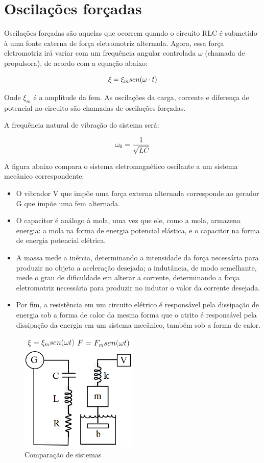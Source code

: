 \section{Oscilações forçadas}

Oscilações forçadas são aquelas que ocorrem quando o circuito RLC é submetido à uma fonte externa de força eletromotriz alternada. Agora, essa força eletromotriz irá variar com um frequência angular controlada $\omega$ (chamada de propulsora), de acordo com a equação abaixo:

\[\large \xi = \xi _{m}sen(\omega \cdot t)\]

Onde $\xi_{m}$ é a amplitude da fem. As oscilações da carga, corrente e diferença de potencial no circuito são chamadas de oscilações forçadas.

A frequência natural de vibração do sistema será:

\[\large \omega_{0} = \frac{1}{\sqrt{LC}}\]

A figura abaixo compara o sistema eletromagnético oscilante a um sistema mecânico correspondente:

\begin{itemize}
\item O vibrador V que impõe uma força externa alternada corresponde ao gerador G que impõe uma fem alternada. 
\item O capacitor é análogo à mola, uma vez que ele, como a mola, armazena energia: a mola na forma de energia potencial elástica, e o capacitor na forma de energia potencial elétrica.
\item A massa mede a inércia, determinando a intensidade da força necessária para produzir no objeto a aceleração desejada; a indutância, de modo semelhante, mede o grau de dificuldade em alterar a corrente, determinando a força eletromotriz necessária para produzir no indutor o valor da corrente desejada.
\item Por fim, a resistência em um circuito elétrico é responsável pela dissipação de energia sob a forma de calor da mesma forma que o atrito é responsável pela dissipação da energia em um sistema mecânico, também sob a forma de calor.
\end{itemize}

\begin{figure}[H]
	\centering
	\includegraphics[width=0.5\textwidth]{./Imagens/RLC/rlc3.png} 
	\caption{Comparação de sistemas}
	\label{fig:RLC3}
\end{figure}

